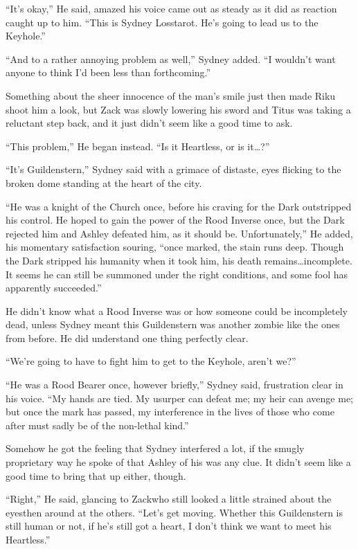 ``It's okay,'' He said, amazed his voice came out as steady as it did as reaction caught up to him. ``This is Sydney Losstarot. He's going to lead us to the Keyhole.''

``And to a rather annoying problem as well,'' Sydney added. ``I wouldn't want anyone to think I'd been less than forthcoming.''

Something about the sheer innocence of the man's smile just then made Riku shoot him a look, but Zack was slowly lowering his sword and Titus was taking a reluctant step back, and it just didn't seem like a good time to ask.

``This problem,'' He began instead. ``Is it Heartless, or is it\ldots ?''

``It's Guildenstern,'' Sydney said with a grimace of distaste, eyes flicking to the broken dome standing at the heart of the city. 
\begin{sloppypar}
``He was a knight of the Church once, before his craving for the Dark outstripped his control. He hoped to gain the power of the Rood Inverse once, but the Dark rejected him and Ashley defeated him, as it should be. Unfortunately,'' He added, his momentary satisfaction souring, ``once marked, the stain runs deep. Though the Dark stripped his humanity when it took him, his death remains\ldots incomplete. It seems he can still be summoned under the right conditions, and some fool has apparently succeeded.''
\end{sloppypar}
He didn't know what a Rood Inverse was or how someone could be incompletely dead, unless Sydney meant this Guildenstern was another zombie like the ones from before. He did understand one thing perfectly clear.

``We're going to have to fight him to get to the Keyhole, aren't we?''

``He was a Rood Bearer once, however briefly,'' Sydney said, frustration clear in his voice. ``My hands are tied. My usurper can defeat me; my heir can avenge me; but once the mark has passed, my interference in the lives of those who come after must sadly be of the non-lethal kind.''

Somehow he got the feeling that Sydney interfered a lot, if the smugly proprietary way he spoke of that Ashley of his was any clue. It didn't seem like a good time to bring that up either, though.

``Right,'' He said, glancing to Zack\textemdash who still looked a little strained about the eyes\textemdash then around at the others. ``Let's get moving. Whether this Guildenstern is still human or not, if he's still got a heart, I don't think we want to meet his Heartless.''



